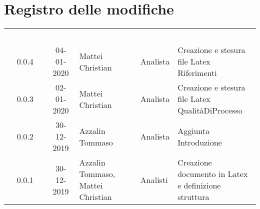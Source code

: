 \section*{Registro delle modifiche}
{
\renewcommand{\arraystretch}{1.5}
\centering
\begin{longtable}{ c c  C{4cm}  C{3cm} C{4cm}}
\textcolor{white}{\textbf{Versione}} & \textcolor{white}{\textbf{Data}} & \textcolor{white}{\textbf{Nominativo}} & \textcolor{white}{\textbf{Ruolo}} & \textcolor{white}{\textbf{Descrizione}}\\	

0.0.4 & 04-01-2020 & Mattei Christian & Analista & Creazione e stesura file Latex Riferimenti \\
0.0.3 & 02-01-2020 & Mattei Christian & Analista & Creazione e stesura file Latex QualitàDiProcesso \\
0.0.2 & 30-12-2019 & Azzalin Tommaso & Analista & Aggiunta Introduzione \\
0.0.1 & 30-12-2019 & Azzalin Tommaso, Mattei Christian & Analisti & Creazione documento in Latex e definizione struttura \\	
		
\end{longtable}
}